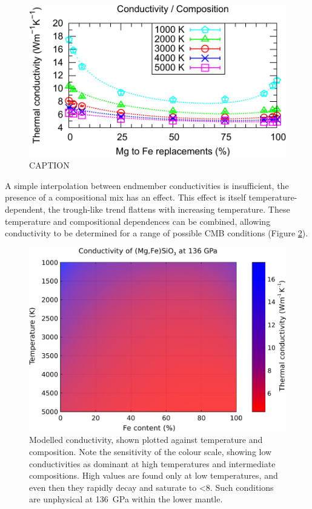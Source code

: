 \begin{figure}[h!]
  \includegraphics[width=\linewidth]{Figures/k-c_all_01.png}
  \caption{CAPTION}
  \label{fig:kappa-comp_01}
\end{figure}

A simple interpolation between endmember conductivities is insufficient, the presence of a compositional mix has an effect. This effect is itself temperature-dependent, the trough-like trend flattens with increasing temperature. These temperature and compositional dependences can be combined, allowing conductivity to be determined for a range of possible CMB conditions (Figure \ref{fig:kappa-temp-comp_01}). 

\begin{figure}[h!]
  \includegraphics[width=\linewidth]{Figures/K_over_T_over_X.png}
  \caption{Modelled conductivity, shown plotted against temperature and composition. Note the sensitivity of the colour scale, showing low conductivities as dominant at high temperatures and intermediate compositions. High values are found only at low temperatures, and even then they rapidly decay and saturate to <8\wmk. Such conditions are unphysical at 136~GPa within the lower mantle.}
  \label{fig:kappa-temp-comp_01}
\end{figure}



